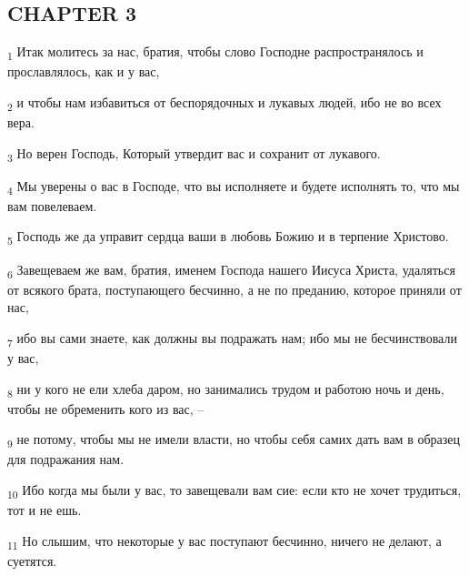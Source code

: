 \subsection{CHAPTER 3}
\begin{tcolorbox}
\textsubscript{1} Итак молитесь за нас, братия, чтобы слово Господне распространялось и прославлялось, как и у вас,
\end{tcolorbox}
\begin{tcolorbox}
\textsubscript{2} и чтобы нам избавиться от беспорядочных и лукавых людей, ибо не во всех вера.
\end{tcolorbox}
\begin{tcolorbox}
\textsubscript{3} Но верен Господь, Который утвердит вас и сохранит от лукавого.
\end{tcolorbox}
\begin{tcolorbox}
\textsubscript{4} Мы уверены о вас в Господе, что вы исполняете и будете исполнять то, что мы вам повелеваем.
\end{tcolorbox}
\begin{tcolorbox}
\textsubscript{5} Господь же да управит сердца ваши в любовь Божию и в терпение Христово.
\end{tcolorbox}
\begin{tcolorbox}
\textsubscript{6} Завещеваем же вам, братия, именем Господа нашего Иисуса Христа, удаляться от всякого брата, поступающего бесчинно, а не по преданию, которое приняли от нас,
\end{tcolorbox}
\begin{tcolorbox}
\textsubscript{7} ибо вы сами знаете, как должны вы подражать нам; ибо мы не бесчинствовали у вас,
\end{tcolorbox}
\begin{tcolorbox}
\textsubscript{8} ни у кого не ели хлеба даром, но занимались трудом и работою ночь и день, чтобы не обременить кого из вас, --
\end{tcolorbox}
\begin{tcolorbox}
\textsubscript{9} не потому, чтобы мы не имели власти, но чтобы себя самих дать вам в образец для подражания нам.
\end{tcolorbox}
\begin{tcolorbox}
\textsubscript{10} Ибо когда мы были у вас, то завещевали вам сие: если кто не хочет трудиться, тот и не ешь.
\end{tcolorbox}
\begin{tcolorbox}
\textsubscript{11} Но слышим, что некоторые у вас поступают бесчинно, ничего не делают, а суетятся.
\end{tcolorbox}
